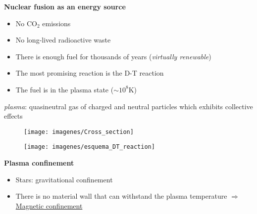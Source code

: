 \documentclass[10pt]{beamer}
\begin{document}
\begin{frame}{\bf Nuclear fusion as an energy source}

\begin{minipage}{0.55\textwidth}
\begin{itemize}

\item No $\text{C} \text{O}_2$ emissions

\item No long-lived radioactive waste

\item There is enough fuel for thousands of years (\textit{virtually renewable})

\item The most promising reaction is the D-T reaction 

\item The fuel is in the plasma state 
($\sim 10^8$K)

\end{itemize}
\vfill
\begin{small}
\textit{plasma}: quasineutral gas of charged and neutral particles which exhibits collective effects
\end{small}
\end{minipage}
%
\hfill
\begin{minipage}{0.42\textwidth}

\begin{figure}[htbp]
\texttt{[image: imagenes/Cross\_section]}
\end{figure}

\begin{figure}[htbp]
\texttt{[image: imagenes/esquema\_DT\_reaction]}
\end{figure}


\end{minipage}

\vfill 




\end{frame}


\begin{frame}{\bf Plasma confinement}

\begin{itemize}

\item Stars: gravitational confinement

\item There is no material wall that can withstand the plasma temperature $\Rightarrow$ \underline{Magnetic confinement}

\end{itemize}

\begin{figure}[htbp]
\centering
{}
{}
\end{figure}

\end{frame}
\end{document}
